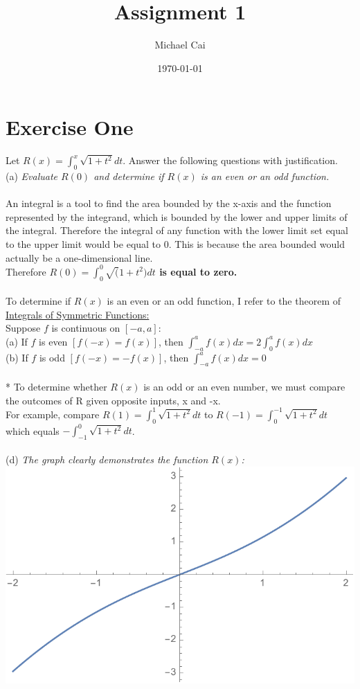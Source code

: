 \documentclass[12pt]{article}
\begin{document}
\title{Assignment 1}
\date{\today}
\author{Michael Cai}

\maketitle{}

\section{Exercise One}

Let $R(x) = \int_{0}^{x}\sqrt{1+t^2}dt$. Answer the following questions with justification.\\

(a) \textit{Evaluate $R(0)$ and determine if $R(x)$ is an even or an odd function.}\\
\\An integral is a tool to find the area bounded by the x-axis and the function represented by the integrand, which is bounded by the lower and upper limits of the integral. Therefore the integral of any function with the lower limit set equal to the upper limit would be equal to 0. This is because the area bounded would actually be a one-dimensional line. \\

Therefore \textbf{$R(0) = \int_{0}^{0} \sqrt(1+t^2) dt$ is equal to zero.} \\
\\
To determine if $R(x)$ is an even or an odd function, I refer to the theorem of \underline{Integrals of Symmetric Functions:}
\\
Suppose $f$ is continuous on $[-a,a]$: \\
(a) If $f$ is even $[f(-x) = f(x)]$, then $\int_{-a}^{a}f(x)dx = 2\int_{0}^{a}f(x)dx$ \\
(b) If $f$ is odd $[f(-x) = -f(x)]$, then $\int_{-a}^{a}f(x)dx = 0$ \\
\\*
To determine whether $R(x)$ is an odd or an even number, we must compare the outcomes of R given opposite inputs, x and -x. \\
For example, compare $R(1) = \int_{0}^{1} \sqrt{1+t^2}dt$ to $R(-1) = \int_{0}^{-1} \sqrt{1+t^2}dt$ which equals $-\int_{-1}^{0} \sqrt{1+t^2}dt$. \\
\\
(d) \textit{The graph clearly demonstrates the function $R(x)$:}\\
\includegraphics[width=.55\textwidth]{d_graph.pdf}
\end{document}

